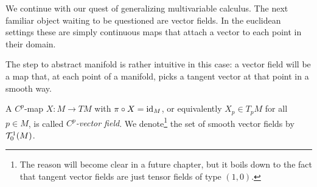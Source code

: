 We continue with our quest of generalizing multivariable calculus.
The next familiar object waiting to be questioned are vector fields.
In the euclidean settings these are simply continuous maps that attach a vector to each point in their domain.

The step to abstract manifold is rather intuitive in this case: a vector field will be a map that, at each point of a manifold, picks a tangent vector at that point in a smooth way.

\begin{defn}
    A $C^p$-map $X: M \to TM$ with $\pi\circ X = \operatorname{id}_M$, or equivalently $X_p\in T_pM$ for all $p\in M$, is called \emph{$C^p$-vector field}.
    We denote\footnote{The reason will become clear in a future chapter, but it boils down to the fact that tangent vector fields are just tensor fields of type $(1,0)$.} the set of smooth vector fields by $\mathcal{T}_0^1(M)$.
\end{defn}